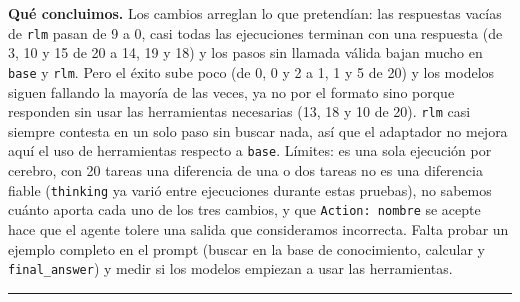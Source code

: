 \textbf{Qué concluimos.} Los cambios arreglan lo que pretendían: las respuestas vacías de \texttt{rlm} pasan de 9 a
0, casi todas las ejecuciones terminan con una respuesta (de 3, 10 y 15 de 20 a 14, 19 y 18) y los pasos
sin llamada válida bajan mucho en \texttt{base} y \texttt{rlm}. Pero el éxito sube poco (de 0, 0 y 2 a 1, 1 y 5 de 20)
y los modelos siguen fallando la mayoría de las veces, ya no por el formato sino porque responden sin
usar las herramientas necesarias (13, 18 y 10 de 20). \texttt{rlm} casi siempre contesta en un solo paso sin
buscar nada, así que el adaptador no mejora aquí el uso de herramientas respecto a \texttt{base}. Límites: es una
sola ejecución por cerebro, con 20 tareas una diferencia de una o dos tareas no es una diferencia fiable
(\texttt{thinking} ya varió entre ejecuciones durante estas pruebas), no sabemos cuánto aporta cada uno de los
tres cambios, y que \texttt{Action: nombre} se acepte hace que el agente tolere una salida que consideramos
incorrecta. Falta probar un ejemplo completo en el prompt (buscar en la base de conocimiento, calcular y
\texttt{final\_\allowbreak{}answer}) y medir si los modelos empiezan a usar las herramientas.

\begin{center}\rule{0.5\linewidth}{0.5pt}\end{center}

\endgroup
